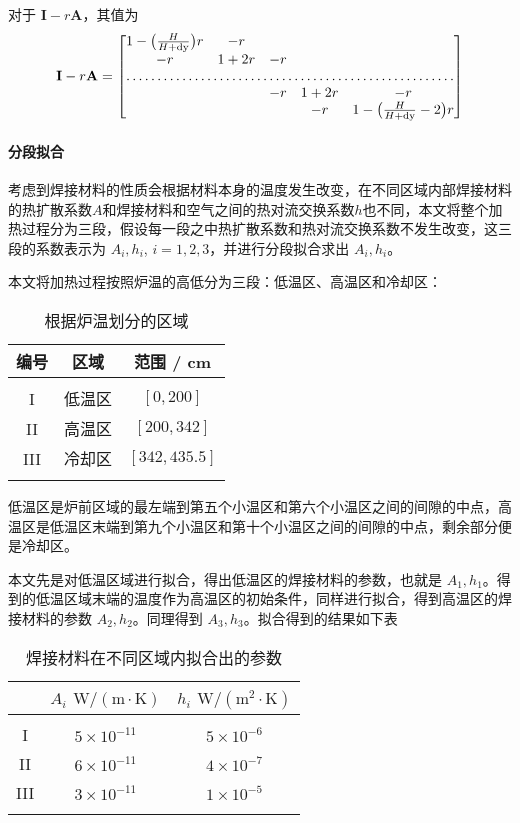 \documentclass[../main.tex]{subfiles}
\begin{document}
对于 \(\mathbf{I} - r \mathbf{A}\)，其值为
\begin{equation}
\mathbf{I} - r \mathbf{A} =
\begin{bmatrix}
1 - \big(\frac{H}{H + \mathrm{dy}}\big) r & -r \\
-r & 1 + 2r & -r \\
\hdotsfor{5}\\
&&-r & 1 + 2r & -r \\
&&& -r & 1 - \big(\frac{H}{H + \mathrm{dy}}- 2\big)r
\end{bmatrix}
\end{equation}

\paragraph{分段拟合} 考虑到焊接材料的性质会根据材料本身的温度发生改变，在不同区域内部焊接材料的热扩散系数\(A\)和焊接材料和空气之间的热对流交换系数\(h\)也不同，本文将整个加热过程分为三段，假设每一段之中热扩散系数和热对流交换系数不发生改变，这三段的系数表示为 \(A_{i}, h_{i}\), \(i = 1 , 2 ,3 \)，并进行分段拟合求出 \(A_{i} ,h_{i}\)。

本文将加热过程按照炉温的高低分为三段：低温区、高温区和冷却区：
\begin{table}[H]
\centering
\begin{tabular}{ccc}
编号&区域 & 范围 / cm \\ \hline \hline
\\ [-1em]
I&低温区& \([0 , 200]\) \\
II&高温区& \([200, 342]\) \\
III&冷却区& \([342, 435.5]\) 
\\ [-1em]
\\ \hline
\end{tabular}\caption{根据炉温划分的区域}
\end{table}
低温区是炉前区域的最左端到第五个小温区和第六个小温区之间的间隙的中点，高温区是低温区末端到第九个小温区和第十个小温区之间的间隙的中点，剩余部分便是冷却区。

本文先是对低温区域进行拟合，得出低温区的焊接材料的参数，也就是 \(A_{1}, h_{1}\)。得到的低温区域末端的温度作为高温区的初始条件，同样进行拟合，得到高温区的焊接材料的参数 \(A_{2}, h_{2}\)。同理得到 \(A_{3}, h_{3}\)。拟合得到的结果如下表
\begin{table}[H]
\centering
\begin{tabular}{ccc}
& \(A_{i}\) \(\mathrm{W}/ (\mathrm{m}\cdot \mathrm{K})\) & \(h_{i}\) \(\mathrm{W} / (\mathrm{m}^{2} \cdot \mathrm{K})\) \\ \hline \hline
\\[-1em]
I & \(5 \times 10 ^{-11}\) & \(5 \times 10 ^{-6}\) \\ 
II & \(6 \times 10 ^{-11}\) & \(4 \times 10 ^{-7}\) \\
III & \(3 \times 10 ^{-11}\) & \(1 \times 10 ^{-5}\) 
\\[-1em]
\\ \hline
\end{tabular}\caption{焊接材料在不同区域内拟合出的参数}
\end{table}
\end{document}
